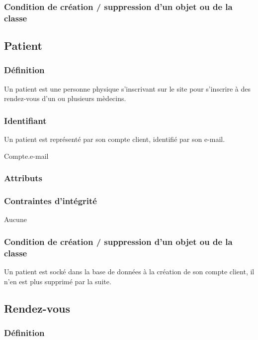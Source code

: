 \documentclass[a4paper, 11pt]{report}
\begin{document}
\subsubsection{Condition de création / suppression d'un objet ou de la classe}

\subsection{Patient}

\subsubsection{Définition}

Un patient est une personne physique s'inscrivant sur le site pour s'inscrire à des rendez-vous d'un ou plusieurs mèdecins.

\subsubsection{Identifiant}

Un patient est représenté par son compte client, identifié par son e-mail.

Compte.e-mail

\subsubsection{Attributs}

\subsubsection{Contraintes d'intégrité}

Aucune

\subsubsection{Condition de création / suppression d'un objet ou de la classe}

Un patient est socké dans la base de données à la création de son compte client, il n'en est plus supprimé par la suite.

\subsection{Rendez-vous}

\subsubsection{Définition}
\end{document}
